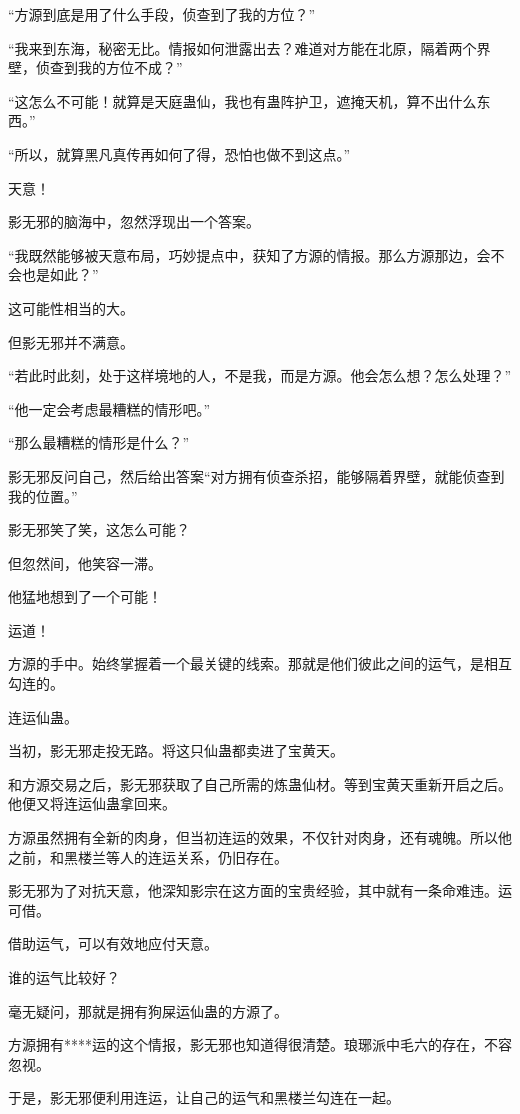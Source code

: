 \begin{this_body}
“方源到底是用了什么手段，侦查到了我的方位？”

“我来到东海，秘密无比。情报如何泄露出去？难道对方能在北原，隔着两个界壁，侦查到我的方位不成？”

“这怎么不可能！就算是天庭蛊仙，我也有蛊阵护卫，遮掩天机，算不出什么东西。”

“所以，就算黑凡真传再如何了得，恐怕也做不到这点。”

天意！

影无邪的脑海中，忽然浮现出一个答案。

“我既然能够被天意布局，巧妙提点中，获知了方源的情报。那么方源那边，会不会也是如此？”

这可能性相当的大。

但影无邪并不满意。

“若此时此刻，处于这样境地的人，不是我，而是方源。他会怎么想？怎么处理？”

“他一定会考虑最糟糕的情形吧。”

“那么最糟糕的情形是什么？”

影无邪反问自己，然后给出答案“对方拥有侦查杀招，能够隔着界壁，就能侦查到我的位置。”

影无邪笑了笑，这怎么可能？

但忽然间，他笑容一滞。

他猛地想到了一个可能！

运道！

方源的手中。始终掌握着一个最关键的线索。那就是他们彼此之间的运气，是相互勾连的。

连运仙蛊。

当初，影无邪走投无路。将这只仙蛊都卖进了宝黄天。

和方源交易之后，影无邪获取了自己所需的炼蛊仙材。等到宝黄天重新开启之后。他便又将连运仙蛊拿回来。

方源虽然拥有全新的肉身，但当初连运的效果，不仅针对肉身，还有魂魄。所以他之前，和黑楼兰等人的连运关系，仍旧存在。

影无邪为了对抗天意，他深知影宗在这方面的宝贵经验，其中就有一条命难违。运可借。

借助运气，可以有效地应付天意。

谁的运气比较好？

毫无疑问，那就是拥有狗屎运仙蛊的方源了。

方源拥有****运的这个情报，影无邪也知道得很清楚。琅琊派中毛六的存在，不容忽视。

于是，影无邪便利用连运，让自己的运气和黑楼兰勾连在一起。


\end{this_body}
